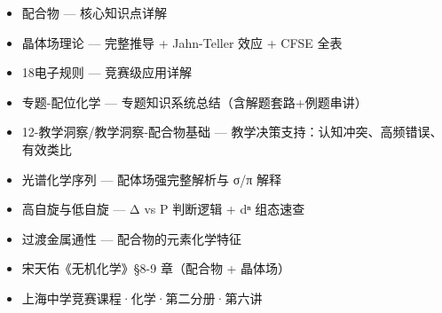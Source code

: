 \documentclass[a4paper,11pt]{ctexart}
\providecommand{\tightlist}{\setlength{\itemsep}{0pt}\setlength{\parskip}{0pt}}
\begin{document}
\begin{itemize}
\tightlist
\item
  配合物 --- 核心知识点详解
\item
  晶体场理论 --- 完整推导 + Jahn-Teller 效应 + CFSE 全表
\item
  18电子规则 --- 竞赛级应用详解
\item
  专题-配位化学 --- 专题知识系统总结（含解题套路+例题串讲）
\item
  12-教学洞察/教学洞察-配合物基础 --- 教学决策支持：认知冲突、高频错误、有效类比
\item
  光谱化学序列 --- 配体场强完整解析与 σ/π 解释
\item
  高自旋与低自旋 --- Δ vs P 判断逻辑 + dⁿ 组态速查
\item
  过渡金属通性 --- 配合物的元素化学特征
\item
  宋天佑《无机化学》§8-9 章（配合物 + 晶体场）
\item
  上海中学竞赛课程·化学·第二分册·第六讲
\end{itemize}
\end{document}
